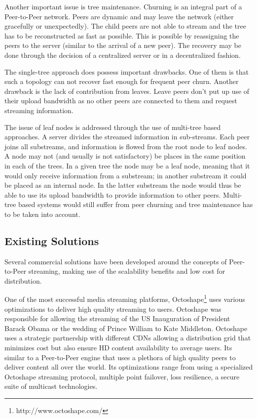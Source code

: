 Another important issue is tree maintenance. Churning is an integral part of
a Peer-to-Peer network. Peers are dynamic and may leave the network (either
gracefully or unexpectedly). The child peers are not able to stream and the
tree has to be reconstructed as fast as possible. This is possible by
reassigning the peers to the server (similar to the arrival of a new peer).
The recovery may be done through the decision of a centralized server or in a
decentralized fashion.

The single-tree approach does possess important drawbacks. One of them is that
such a topology can not recover fast enough for frequent peer churn. Another
drawback is the lack of contribution from leaves. Leave peers don't put up use
of their upload bandwidth as no other peers are connected to them and request
streaming information.

The issue of leaf nodes is addressed through the use of multi-tree based
approaches. A server divides the streamed information in sub-streams. Each
peer joins all substreams, and information is flowed from the root node to
leaf nodes. A node may not (and usually is not satisfactory) be places in the
same position in each of the trees. In a given tree the node may be a leaf
node, meaning that it would only receive information from a substream; in
another substream it could be placed as an internal node. In the latter
substream the node would thus be able to use its upload bandwidth to provide
information to other peers. Multi-tree based systems would still suffer from
peer churning and tree maintenance has to be taken into account.

\subsection{Existing Solutions}
\label{subsec:p2p-systems:solutions}

Several commercial solutions have been developed around the concepts of
Peer-to-Peer streaming, making use of the scalability benefits and low cost
for distribution.

One of the most successful media streaming platforms,
Octoshape\footnote{http://www.octoshape.com/} uses various optimizations to
deliver high quality streaming to users.  Octoshape was responsible for
allowing the streaming of the US Inauguration of President Barack Obama or the
wedding of Prince William to Kate Middleton.  Octoshape uses a strategic
partnership with different CDNs allowing a distribution grid that minimizes
cost but also ensure HD content availability to average users. Its similar to
a Peer-to-Peer engine that uses a plethora of high quality peers to deliver
content all over the world. Its optimizations range from using a specialized
Octoshape streaming protocol, multiple point failover, loss resilience, a
secure suite of multicast technologies.

